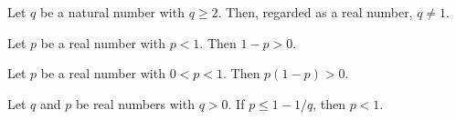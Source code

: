 \begin{lemma}
\label{ErrorCorrectingCodes.Codeword.natCast_ne_one_of_two_le}
\leanok
{}
Let $q$ be a natural number with $q \ge 2$. Then, regarded as a real number, $q \ne 1$.
\end{lemma}

\begin{lemma}
\label{ErrorCorrectingCodes.Codeword.one_sub_pos_of_lt_one}
\leanok
{}
Let $p$ be a real number with $p < 1$. Then $1 - p > 0$.
\end{lemma}

\begin{lemma}
\label{ErrorCorrectingCodes.Codeword.mul_one_sub_pos}
\leanok
{}
Let $p$ be a real number with $0 < p < 1$. Then $p(1-p) > 0$.
\end{lemma}

\begin{lemma}
\label{ErrorCorrectingCodes.Codeword.lt_one_of_le_one_sub_inv}
\leanok
{}
Let $q$ and $p$ be real numbers with $q > 0$. If $p \le 1 - 1/q$, then $p < 1$.
\end{lemma}

